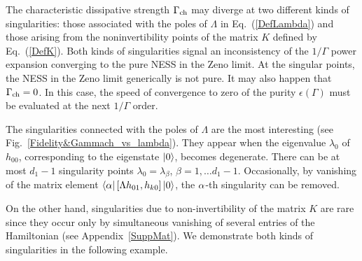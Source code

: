 \documentclass[aps,pra,letterpaper,twocolumn,showpacs,superscriptaddress,floatfix,longbibliography]{revtex4-1}
\begin{document}
The characteristic dissipative strength $\Gamma_{\rm{ch}}$ may diverge
at two different kinds of singularities: those associated with the
poles of $\Lambda$ in Eq.~(\ref{DefLambda}) and those arising from the
noninvertibility points of the matrix $K$ defined by Eq.~(\ref{DefK}).
Both kinds of singularities signal an inconsistency of the $1/\Gamma$
power expansion converging to the pure NESS in the Zeno limit.  At the
singular points, the NESS in the Zeno limit generically is not pure.
It may also happen that $\Gamma_{\rm{ch}}=0$. In this case, the speed
of convergence to zero of the purity $\epsilon(\Gamma)$ must be
evaluated at the next $1/\Gamma$ order.

The singularities connected with the poles of $\Lambda$ are the most
interesting (see Fig.~\ref{Fidelity&Gammach_vs_lambda}). They appear
when the eigenvalue $\lambda_0$ of $h_{00}$, corresponding to the
eigenstate $|{0}\rangle$, becomes degenerate. There can be at most $d_1-1$
singularity points $\lambda_0=\lambda_\beta$, $\beta=1,\ldots d_1-1$.
Occasionally, by vanishing of the matrix element
$\langle{\alpha}|\left[\Lambda h_{01},h_{k0} \right] |{0}\rangle $, the
$\alpha$-th singularity can be removed.

On the other hand, singularities due to non-invertibility of the
matrix $K$ are rare since they occur only by simultaneous vanishing of
several entries of the Hamiltonian (see Appendix~\ref{SuppMat}).  We
demonstrate both kinds of singularities in the following example.
\end{document}
